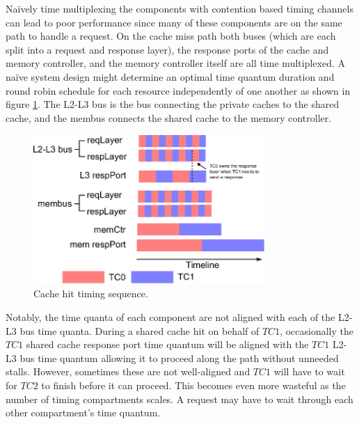 Naïvely time multiplexing the components with contention based timing channels 
can lead to poor performance since many of these components are on the same 
path to handle a request. 
On the cache miss path both buses (which are each split into a request and 
response layer), the response ports of the cache and memory controller, and the 
memory controller itself are all time multiplexed. A naïve system design might 
determine an optimal time quantum duration and round robin schedule for each 
resource independently of one another as shown in figure 
\ref{fig:naive_scheme}. The L2-L3 bus is the bus connecting the private caches 
to the shared cache, and the membus connects the shared cache to the memory 
controller.

\begin{figure}
    \begin{center}
        \includegraphics[width=3.46in]{figs/baseline_schedule.eps}
        \caption{Cache hit timing sequence.}
        \label{fig:naive_scheme}
    \end{center}
\end{figure}

Notably, the time quanta of each component are not aligned with each of the 
L2-L3 bus time quanta.  During a shared cache hit on behalf of $TC1$, 
occasionally the $TC1$ shared cache response port time quantum will be aligned 
with the $TC1$ L2-L3 bus time quantum allowing it to proceed along the path 
without unneeded stalls.  However, sometimes these are not well-aligned and 
$TC1$ will have to wait for $TC2$ to finish before it can proceed. This becomes 
even more wasteful
as the number of timing compartments scales. A request may have to wait through 
each other compartment's time quantum. 


